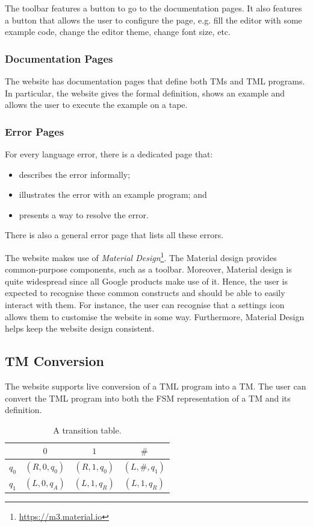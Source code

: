 The toolbar features a button to go to the documentation pages. It also features a button that allows the user to configure the page, e.g. fill the editor with some example code, change the editor theme, change font size, etc. 

\subsubsection{Documentation Pages}
The website has documentation pages that define both TMs and TML programs. In particular, the website gives the formal definition, shows an example and allows the user to execute the example on a tape.

\subsubsection{Error Pages}
For every language error, there is a dedicated page that:
\begin{itemize}
    \item describes the error informally;
    \item illustrates the error with an example program; and 
    \item presents a way to resolve the error.
\end{itemize}
There is also a general error page that lists all these errors.

The website makes use of \emph{Material Design}\footnote{\url{https://m3.material.io}}. The Material design provides common-purpose components, such as a toolbar. Moreover, Material design is quite widespread since all Google products make use of it. Hence, the user is expected to recognise these common constructs and should be able to easily interact with them. For instance, the user can recognise that a settings icon allows them to customise the website in some way. Furthermore, Material Design helps keep the website design consistent.

\subsection{TM Conversion}
The website supports live conversion of a TML program into a TM. The user can convert the TML program into both the FSM representation of a TM and its definition.

\begin{table}[htb]
    \centering
    \begin{tabular}{c|ccc}
        & $0$ & $1$ & $\#$ \\
        \hline
        $q_0$ & $(R, 0, q_0)$ & $(R, 1, q_0)$ & $(L, \#, q_1)$ \\
        $q_1$ & $(L, 0, q_A)$ & $(L, 1, q_R)$ & $(L, 1, q_R)$ 
    \end{tabular}
    \caption{A transition table.}
    \label{tbl:table_isDiv2}
\end{table}

